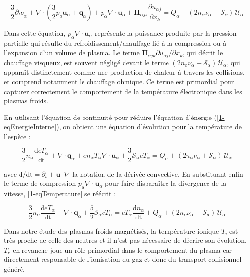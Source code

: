 \begin{refsection}
\begin{equation}
\label{1-eqEnergieInterne}
\frac{3}{2}\partial_t p_\alpha + 
\nabla\cdot\left(\frac{3}{2}p_\alpha
\mathbf{u}_\alpha+\mathbf q_\alpha\right)+p_\alpha\nabla\cdot\mathbf u_\alpha
+\boldsymbol{\Pi}_{\alpha j k}\frac{\partial u_{\alpha j}}{\partial{x_k}} =
{Q_\alpha}+(2n_\alpha\nu_\alpha+\mathcal{S}_\alpha)\,\mathcal{U}_\alpha
\end{equation}

Dans cette équation, $p_\alpha\nabla\cdot\mathbf u_\alpha$ représente la
puissance produite par la pression partielle qui résulte du
refroidissement/chauffage lié à la compression ou à l'expansion d'un volume de
plasma. Le terme $\boldsymbol{\Pi}_{\alpha j k}\partial u_{\alpha
j}/\partial{x_k}$, qui décrit le chauffage visqueux, est souvent négligé
devant le terme $(2n_\alpha\nu_\alpha+\mathcal{S}_\alpha)\,\mathcal{U}_\alpha$, 
qui apparaît distinctement comme une production de chaleur
à travers les collisions, et comprend notamment le chauffage ohmique. Ce
 terme est primordial pour capturer correctement le comportement de la
température électronique dans les plasmas froids.

En utilisant l'équation de
continuité pour réduire l'équation d'énergie (\eqref{1-eqEnergieInterne}), on
obtient une équation d'évolution pour la température de l'espèce :

\begin{equation}
\label{1-eqTemperature}
\frac{3}{2}n_\alpha\frac{\text{d}eT_\alpha}{\text{dt}}+\nabla\cdot\mathbf
q_\alpha + en_\alpha T_\alpha\nabla\cdot\mathbf u_\alpha +
\frac{3}{2}\mathcal{S}_\alpha eT_\alpha =
{Q_\alpha}+(2n_\alpha\nu_\alpha+\mathcal{S}_\alpha)\,\mathcal{U}_\alpha
\end{equation}

avec $\text{d}/\text{dt}=\partial_t+\mathbf u\cdot\nabla$ la notation de la
dérivée convective. En substituant enfin le terme de compression
$p_\alpha\nabla\cdot\mathbf u_\alpha$ pour faire disparaître la divergence de la
vitesse, \eqref{1-eqTemperature} se réécrit :

\begin{equation}
\label{1-eqTemperature2}
\frac{3}{2}n_\alpha\frac{\text{d}eT_\alpha}{\text{dt}}+\nabla\cdot\mathbf
q_\alpha + \frac{5}{2}\mathcal{S}_\alpha eT_\alpha =
eT_\alpha\frac{\text{d}n_\alpha}{\text{dt}}+
{Q_\alpha}+(2n_\alpha\nu_\alpha+\mathcal{S}_\alpha)\,\mathcal{U}_\alpha
\end{equation}

Dans notre étude des plasmas froids magnétisés, la température ionique $T_i$
est très proche de celle des neutres et il n'est pas nécessaire de décrire
son évolution. $T_e$ en revanche joue un rôle primordial dans le comportement
du plasma car directement responsable de l'ionisation du gaz et donc du
transport collisionnel généré. 


\end{refsection}
